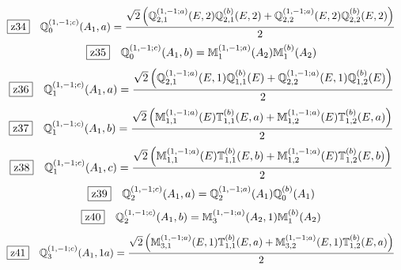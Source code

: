 \documentclass[fleqn,10pt,landscape]{jsarticle}
\begin{document}
\begin{dmath*}
\hspace*{3mm}\fbox{z34}\quad \mathbb{Q}_{0}^{(1,-1;c)}(A_{1},a)=\frac{\sqrt{2} \left(\mathbb{Q}_{2,1}^{(1,-1;a)}(E,2) \mathbb{Q}_{2,1}^{(b)}(E,2) + \mathbb{Q}_{2,2}^{(1,-1;a)}(E,2) \mathbb{Q}_{2,2}^{(b)}(E,2)\right)}{2}
\end{dmath*}
\begin{dmath*}
\hspace*{3mm}\fbox{z35}\quad \mathbb{Q}_{0}^{(1,-1;c)}(A_{1},b)=\mathbb{M}_{1}^{(1,-1;a)}(A_{2}) \mathbb{M}_{1}^{(b)}(A_{2})
\end{dmath*}
\begin{dmath*}
\hspace*{3mm}\fbox{z36}\quad \mathbb{Q}_{1}^{(1,-1;c)}(A_{1},a)=\frac{\sqrt{2} \left(\mathbb{Q}_{2,1}^{(1,-1;a)}(E,1) \mathbb{Q}_{1,1}^{(b)}(E) + \mathbb{Q}_{2,2}^{(1,-1;a)}(E,1) \mathbb{Q}_{1,2}^{(b)}(E)\right)}{2}
\end{dmath*}
\begin{dmath*}
\hspace*{3mm}\fbox{z37}\quad \mathbb{Q}_{1}^{(1,-1;c)}(A_{1},b)=\frac{\sqrt{2} \left(\mathbb{M}_{1,1}^{(1,-1;a)}(E) \mathbb{T}_{1,1}^{(b)}(E,a) + \mathbb{M}_{1,2}^{(1,-1;a)}(E) \mathbb{T}_{1,2}^{(b)}(E,a)\right)}{2}
\end{dmath*}
\begin{dmath*}
\hspace*{3mm}\fbox{z38}\quad \mathbb{Q}_{1}^{(1,-1;c)}(A_{1},c)=\frac{\sqrt{2} \left(\mathbb{M}_{1,1}^{(1,-1;a)}(E) \mathbb{T}_{1,1}^{(b)}(E,b) + \mathbb{M}_{1,2}^{(1,-1;a)}(E) \mathbb{T}_{1,2}^{(b)}(E,b)\right)}{2}
\end{dmath*}
\begin{dmath*}
\hspace*{3mm}\fbox{z39}\quad \mathbb{Q}_{2}^{(1,-1;c)}(A_{1},a)=\mathbb{Q}_{2}^{(1,-1;a)}(A_{1}) \mathbb{Q}_{0}^{(b)}(A_{1})
\end{dmath*}
\begin{dmath*}
\hspace*{3mm}\fbox{z40}\quad \mathbb{Q}_{2}^{(1,-1;c)}(A_{1},b)=\mathbb{M}_{3}^{(1,-1;a)}(A_{2},1) \mathbb{M}_{1}^{(b)}(A_{2})
\end{dmath*}
\begin{dmath*}
\hspace*{3mm}\fbox{z41}\quad \mathbb{Q}_{3}^{(1,-1;c)}(A_{1},1a)=\frac{\sqrt{2} \left(\mathbb{M}_{3,1}^{(1,-1;a)}(E,1) \mathbb{T}_{1,1}^{(b)}(E,a) + \mathbb{M}_{3,2}^{(1,-1;a)}(E,1) \mathbb{T}_{1,2}^{(b)}(E,a)\right)}{2}
\end{dmath*}
\end{document}
